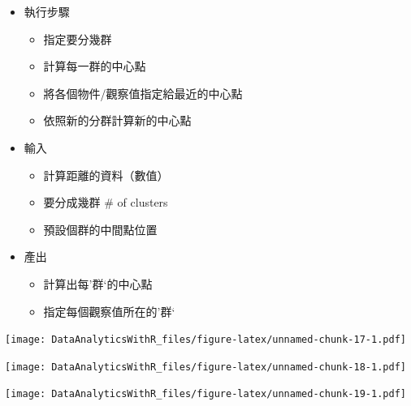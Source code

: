 \documentclass[
]{book}
\newenvironment{Shaded}{\begin{snugshade}}{\end{snugshade}}
\newcommand{\DataTypeTok}[1]{\textcolor[rgb]{0.13,0.29,0.53}{#1}}
\newcommand{\DecValTok}[1]{\textcolor[rgb]{0.00,0.00,0.81}{#1}}
\newcommand{\FloatTok}[1]{\textcolor[rgb]{0.00,0.00,0.81}{#1}}
\newcommand{\KeywordTok}[1]{\textcolor[rgb]{0.13,0.29,0.53}{\textbf{#1}}}
\newcommand{\NormalTok}[1]{#1}
\newcommand{\OperatorTok}[1]{\textcolor[rgb]{0.81,0.36,0.00}{\textbf{#1}}}
\newcommand{\StringTok}[1]{\textcolor[rgb]{0.31,0.60,0.02}{#1}}
\providecommand{\tightlist}{%
  \setlength{\itemsep}{0pt}\setlength{\parskip}{0pt}}
\begin{document}
\begin{itemize}
\tightlist
\item
  執行步驟

  \begin{itemize}
  \tightlist
  \item
    指定要分幾群
  \item
    計算每一群的中心點
  \item
    將各個物件/觀察值指定給最近的中心點
  \item
    依照新的分群計算新的中心點
  \end{itemize}
\item
  輸入

  \begin{itemize}
  \tightlist
  \item
    計算距離的資料（數值）
  \item
    要分成幾群 \# of clusters
  \item
    預設個群的中間點位置
  \end{itemize}
\item
  產出

  \begin{itemize}
  \tightlist
  \item
    計算出每'群`的中心點
  \item
    指定每個觀察值所在的'群`
  \end{itemize}
\end{itemize}

\begin{Shaded}
\end{Shaded}

\texttt{[image: DataAnalyticsWithR\_files/figure-latex/unnamed-chunk-17-1.pdf]}

\texttt{[image: DataAnalyticsWithR\_files/figure-latex/unnamed-chunk-18-1.pdf]}

\texttt{[image: DataAnalyticsWithR\_files/figure-latex/unnamed-chunk-19-1.pdf]}
\end{document}
